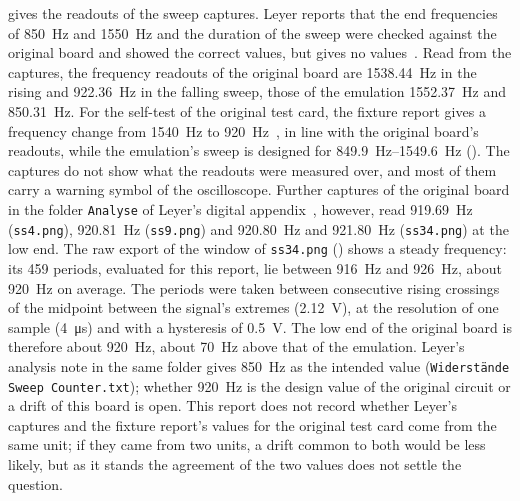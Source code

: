  gives the readouts of the sweep captures. Leyer reports that the end frequencies of \SI{850}{\hertz} and \SI{1550}{\hertz} and the duration of the sweep were checked against the original board and showed the correct values, but gives no values~\cite[Sec.~4.10]{leyer2023}. Read from the captures, the frequency readouts of the original board are \SI{1538.44}{\hertz} in the rising and \SI{922.36}{\hertz} in the falling sweep, those of the emulation \SI{1552.37}{\hertz} and \SI{850.31}{\hertz}. For the self-test of the original test card, the fixture report gives a frequency change from \SI{1540}{\hertz} to \SI{920}{\hertz}~\cite[Sec.~5.1.5]{dolata2023}, in line with the original board's readouts, while the emulation's sweep is designed for \SIrange{849.9}{1549.6}{\hertz} (). The captures do not show what the readouts were measured over, and most of them carry a warning symbol of the oscilloscope. Further captures of the original board in the folder \texttt{Analyse} of Leyer's digital appendix~\cite{leyer2023}, however, read \SI{919.69}{\hertz} (\texttt{ss4.png}), \SI{920.81}{\hertz} (\texttt{ss9.png}) and \SI{920.80}{\hertz} and \SI{921.80}{\hertz} (\texttt{ss34.png}) at the low end. The raw export of the window of \texttt{ss34.png} () shows a steady frequency: its 459 periods, evaluated for this report, lie between \SI{916}{\hertz} and \SI{926}{\hertz}, about \SI{920}{\hertz} on average. The periods were taken between consecutive rising crossings of the midpoint between the signal's extremes (\SI{2.12}{\volt}), at the resolution of one sample (\SI{4}{\micro\second}) and with a hysteresis of \SI{0.5}{\volt}. The low end of the original board is therefore about \SI{920}{\hertz}, about \SI{70}{\hertz} above that of the emulation. Leyer's analysis note in the same folder gives \SI{850}{\hertz} as the intended value (\texttt{Widerstände Sweep Counter.txt}); whether \SI{920}{\hertz} is the design value of the original circuit or a drift of this board is open. This report does not record whether Leyer's captures and the fixture report's values for the original test card come from the same unit; if they came from two units, a drift common to both would be less likely, but as it stands the agreement of the two values does not settle the question.

